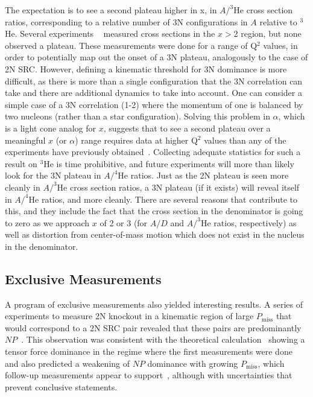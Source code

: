 The expectation is to see a second plateau higher in x, in $A/^3\mathrm{He}$ cross section ratios, corresponding to a relative number of 3N configurations in $A$ relative to $^3$He.  Several experiments ~\cite{PhysRevLett.96.082501, Fomin:2011ng, PhysRevC.97.065204}  measured cross sections in the $x>$2 region, but none observed a plateau.  These measurements were done for a range of Q$^2$ values, in order to potentially map out the onset of a 3N plateau, analogously to the case of 2N SRC.  However, defining a kinematic threshold for 3N dominance is more difficult, as there is more than a single configuration that the 3N correlation can take and there are additional dynamics to take into account.  One can consider a simple case of a 3N correlation (1-2) where the momentum of one is balanced by two nucleons (rather than a star configuration).  Solving this problem in $\alpha$, which is a light cone analog for $x$, suggests that to see a second plateau over a meaningful $x$ (or $\alpha$) range requires data at higher Q$^2$ values than any of the experiments have previously obtained~\cite{Fomin:2017ydn}.  Collecting adequate statistics for such a result on $^3$He is time prohibitive, and future experiments will more than likely look for the 3N plateau in $A/^4\mathrm{He}$ ratios.  Just as the 2N plateau is seen more cleanly in $A/^3\mathrm{He}$ cross section ratios, a 3N plateau (if it exists) will reveal itself in  $A/^4\mathrm{He}$ ratios, and more cleanly.  There are several reasons that contribute to this, and they include the fact that the cross section in the denominator is going to zero as we approach $x$ of 2 or 3 (for $A/D$ and $A/^3\mathrm{He}$ ratios, respectively) as well as distortion from center-of-mass motion which does not exist in the nucleus in the denominator. 

\subsection{Exclusive Measurements}
A program of exclusive measurements also yielded interesting results. A series of experiments to measure 2N knockout in a kinematic region of large $P_\mathrm{miss}$ that would correspond to a 2N SRC pair revealed that these pairs are predominantly $NP$~\cite{Subedi:2008zz, Shneor:2007tu}.  This observation was consistent with the theoretical calculation~\cite{Schiavilla:2006xx} showing a tensor force dominance in the regime where the first measurements were done and also predicted a weakening of $NP$ dominance with growing $P_\mathrm{miss}$, which follow-up measurements appear to support~\cite{Korover:2014dma}, although with uncertainties that prevent conclusive statements. 


